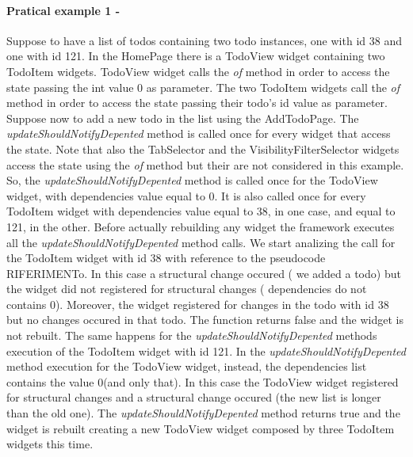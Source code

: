 \paragraph{Pratical example 1 - } 
\label{subpar:todo_updating_feature_inherited_wdiget}
Suppose to have a list of todos containing two todo instances, one with id 38 and one with id 121. In the HomePage there is a TodoView widget containing two TodoItem widgets. TodoView widget calls the \textit{of} method in order to access the state passing the int value 0 as parameter. The two TodoItem widgets call the \textit{of} method in order to access the state passing their todo's id value as parameter. Suppose now to add a new todo in the list using the AddTodoPage. The \textit{updateShouldNotifyDepented} method is called once for every widget that access the state. Note that also the TabSelector and the VisibilityFilterSelector widgets access the state using the \textit{of} method but their are not considered in this example. So, the \textit{updateShouldNotifyDepented} method is called once for the TodoView widget, with dependencies value equal to 0. It is also called once for every TodoItem widget with dependencies value equal to 38, in one case, and equal to 121, in the other. Before actually rebuilding any widget the framework executes all the \textit{updateShouldNotifyDepented} method calls. We start analizing the call for the TodoItem widget with id 38 with reference to the pseudocode RIFERIMENTo. In this case a structural change occured ( we added a todo)  but the widget did not registered for structural changes ( dependencies do not contains 0). Moreover, the widget registered for changes in the todo with id 38 but no changes occured in that todo. The function returns false and the widget is not rebuilt. The same happens for the \textit{updateShouldNotifyDepented} methods execution of the TodoItem widget with id 121. In the \textit{updateShouldNotifyDepented} method execution for the TodoView widget, instead, the dependencies list contains the value 0(and only that). In this case the TodoView widget registered for structural changes and a structural change occured (the new list is longer than the old one). The \textit{updateShouldNotifyDepented} method returns true and the widget is rebuilt creating a new TodoView widget composed by three TodoItem widgets this time.
